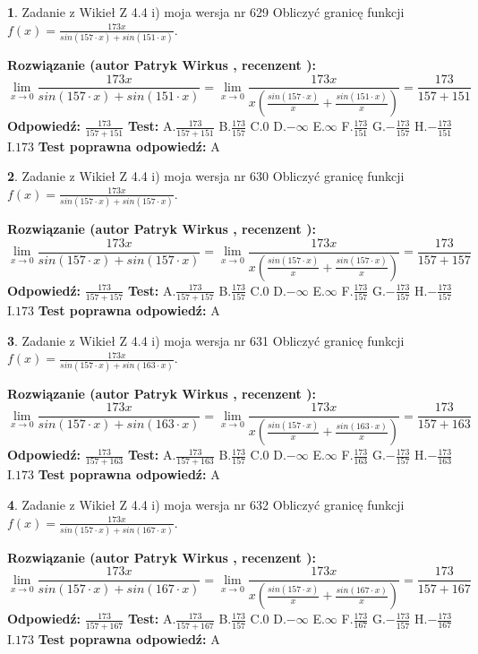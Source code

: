 \documentclass[12pt, a4paper]{article}
\theoremstyle{definition} %
\newtheorem{zad}{}
\newcommand{\zadStart}[1]{\begin{zad}#1\newline}
\newcommand{\zadStop}{\end{zad}}
\newcommand{\rozwStart}[2]{\noindent \textbf{Rozwiązanie (autor #1 , recenzent #2): }\newline}
\newcommand{\rozwStop}{\newline}
\newcommand{\odpStart}{\noindent \textbf{Odpowiedź:}\newline}
\newcommand{\odpStop}{\newline}
\newcommand{\testStart}{\noindent \textbf{Test:}\newline}
\newcommand{\testStop}{\newline}
\newcommand{\kluczStart}{\noindent \textbf{Test poprawna odpowiedź:}\newline}
\newcommand{\kluczStop}{\newline}
\begin{document}
\zadStart{Zadanie z Wikieł Z 4.4 i) moja wersja nr 629}
Obliczyć granicę funkcji $f(x)=\frac{173x}{sin(157\cdot x) +sin(151\cdot x)}$.
\zadStop
\rozwStart{Patryk Wirkus}{}
$$\lim\limits_{x\to 0}\frac{173x}{sin(157\cdot x) +sin(151\cdot x)}=\lim\limits_{x\to 0}\frac{173x}{x(\frac{sin(157\cdot x)}{x}+\frac{sin(151\cdot x)}{x})}=\frac{173}{157+151}$$
\rozwStop
\odpStart
$\frac{173}{157+151}$
\odpStop
\testStart
A.$\frac{173}{157+151}$
B.$\frac{173}{157}$
C.$0$
D.$-\infty$
E.$\infty$
F.$\frac{173}{151}$
G.$-\frac{173}{157}$
H.$-\frac{173}{151}$
I.$173$
\testStop
\kluczStart
A
\kluczStop



\zadStart{Zadanie z Wikieł Z 4.4 i) moja wersja nr 630}
Obliczyć granicę funkcji $f(x)=\frac{173x}{sin(157\cdot x) +sin(157\cdot x)}$.
\zadStop
\rozwStart{Patryk Wirkus}{}
$$\lim\limits_{x\to 0}\frac{173x}{sin(157\cdot x) +sin(157\cdot x)}=\lim\limits_{x\to 0}\frac{173x}{x(\frac{sin(157\cdot x)}{x}+\frac{sin(157\cdot x)}{x})}=\frac{173}{157+157}$$
\rozwStop
\odpStart
$\frac{173}{157+157}$
\odpStop
\testStart
A.$\frac{173}{157+157}$
B.$\frac{173}{157}$
C.$0$
D.$-\infty$
E.$\infty$
F.$\frac{173}{157}$
G.$-\frac{173}{157}$
H.$-\frac{173}{157}$
I.$173$
\testStop
\kluczStart
A
\kluczStop



\zadStart{Zadanie z Wikieł Z 4.4 i) moja wersja nr 631}
Obliczyć granicę funkcji $f(x)=\frac{173x}{sin(157\cdot x) +sin(163\cdot x)}$.
\zadStop
\rozwStart{Patryk Wirkus}{}
$$\lim\limits_{x\to 0}\frac{173x}{sin(157\cdot x) +sin(163\cdot x)}=\lim\limits_{x\to 0}\frac{173x}{x(\frac{sin(157\cdot x)}{x}+\frac{sin(163\cdot x)}{x})}=\frac{173}{157+163}$$
\rozwStop
\odpStart
$\frac{173}{157+163}$
\odpStop
\testStart
A.$\frac{173}{157+163}$
B.$\frac{173}{157}$
C.$0$
D.$-\infty$
E.$\infty$
F.$\frac{173}{163}$
G.$-\frac{173}{157}$
H.$-\frac{173}{163}$
I.$173$
\testStop
\kluczStart
A
\kluczStop



\zadStart{Zadanie z Wikieł Z 4.4 i) moja wersja nr 632}
Obliczyć granicę funkcji $f(x)=\frac{173x}{sin(157\cdot x) +sin(167\cdot x)}$.
\zadStop
\rozwStart{Patryk Wirkus}{}
$$\lim\limits_{x\to 0}\frac{173x}{sin(157\cdot x) +sin(167\cdot x)}=\lim\limits_{x\to 0}\frac{173x}{x(\frac{sin(157\cdot x)}{x}+\frac{sin(167\cdot x)}{x})}=\frac{173}{157+167}$$
\rozwStop
\odpStart
$\frac{173}{157+167}$
\odpStop
\testStart
A.$\frac{173}{157+167}$
B.$\frac{173}{157}$
C.$0$
D.$-\infty$
E.$\infty$
F.$\frac{173}{167}$
G.$-\frac{173}{157}$
H.$-\frac{173}{167}$
I.$173$
\testStop
\kluczStart
A
\kluczStop
\end{document}
